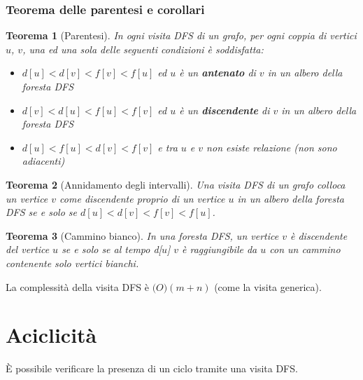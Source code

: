 \documentclass[11pt]{article}
\newtheorem*{theorem}{Teorema}
\begin{document}
\subsubsection{Teorema delle parentesi e corollari}
\begin{theorem}[Parentesi]
    In ogni visita DFS di un grafo, per ogni coppia di vertici $u$, $v$, una ed una sola delle seguenti condizioni è soddisfatta: 
    \begin{itemize}
        \item $d[u]<d[v]<f[v]<f[u]$ ed $u$ è un \textbf{antenato} di $v$ in un albero della foresta DFS 
        \item $d[v]<d[u]<f[u]<f[v]$ ed $u$ è un \textbf{discendente} di $v$ in un albero della foresta DFS
        \item $d[u]<f[u]<d[v]<f[v]$ e tra $u$ e $v$ non esiste relazione (non sono adiacenti)
    \end{itemize}
\end{theorem}
\begin{theorem}[Annidamento degli intervalli]
    Una visita DFS di un grafo colloca un vertice $v$ come discendente proprio di un vertice $u$ in un albero della foresta 
    DFS se e solo se $d[u]<d[v]<f[v]<f[u]$.
\end{theorem}
\begin{theorem}[Cammino bianco]
    In una foresta DFS, un vertice $v$ è discendente del vertice $u$ se e solo se al tempo d[$u$] $v$ è raggiungibile da 
    $u$ con un cammino contenente solo vertici bianchi.
\end{theorem}
La complessità della visita DFS è $\mathcal(O)(m+n)$ (come la visita generica).
\section{Aciclicità}
È possibile verificare la presenza di un ciclo tramite una visita DFS.
\end{document}
